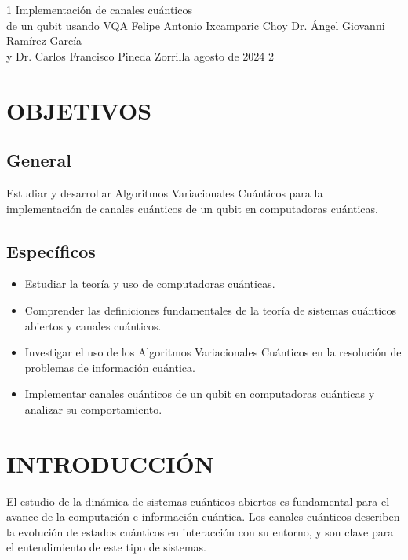 \documentclass[letterpaper,12pt]{thesisECFM}
\theoremstyle{plain}
\theoremstyle{definition}
\theoremstyle{definition}
\theoremstyle{remark}
\newcommand{\1}{\mathbb{1}}
\begin{document}
\datosThesis%
{1}%
{Implementación de canales cuánticos \\ de un qubit usando VQA}%
{Felipe Antonio Ixcamparic Choy}%
{Dr. Ángel Giovanni Ramírez García\\y Dr. Carlos Francisco Pineda Zorrilla}%
{agosto de 2024}		%
{2}							%

\tableofcontents    %

\mainmatter
\chapter*{OBJETIVOS} %
\section*{General} 
Estudiar y desarrollar Algoritmos Variacionales Cuánticos para la implementación de canales cuánticos de un  qubit en computadoras cuánticas.

\section*{Específicos}
\begin{itemize}
    \item Estudiar la teoría y uso de computadoras cuánticas.
    \item Comprender las definiciones fundamentales de la teoría de sistemas cuánticos abiertos y canales cuánticos.
    \item Investigar el uso de los Algoritmos Variacionales Cuánticos en la resolución de problemas de información cuántica.
    \item Implementar canales cuánticos de un qubit en computadoras cuánticas y analizar su comportamiento.
\end{itemize}
\chapter*{INTRODUCCIÓN} %
El estudio de la dinámica de sistemas cuánticos abiertos es fundamental para el avance de la computación e información cuántica. Los canales cuánticos describen la evolución de estados cuánticos en  interacción con su entorno, y son clave para el entendimiento de este tipo de sistemas.
\end{document}
